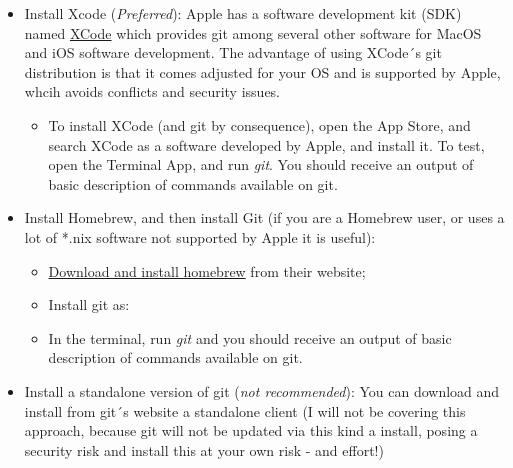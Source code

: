 \documentclass[
]{book}
\newenvironment{Shaded}{\begin{snugshade}}{\end{snugshade}}
\newcommand{\ExtensionTok}[1]{#1}
\newcommand{\NormalTok}[1]{#1}
\providecommand{\tightlist}{%
  \setlength{\itemsep}{0pt}\setlength{\parskip}{0pt}}
\begin{document}
\begin{itemize}
\tightlist
\item
  Install Xcode (\emph{Preferred}): Apple has a software development kit (SDK) named
  \href{https://developer.apple.com/xcode/}{XCode} which provides git among several other
  software for MacOS and iOS software development. The advantage of using XCode´s
  git distribution is that it comes adjusted for your OS and is supported by Apple,
  whcih avoids conflicts and security issues.

  \begin{itemize}
  \tightlist
  \item
    To install XCode (and git by consequence), open the App Store, and search
    XCode as a software developed by Apple, and install it. To test, open the
    Terminal App, and run \emph{git}. You should receive an output of basic
    description of commands available on git.
  \end{itemize}
\item
  Install Homebrew, and then install Git (if you are a Homebrew user, or uses a
  lot of *.nix software not supported by Apple it is useful):

  \begin{itemize}
  \tightlist
  \item
    \href{https://brew.sh/}{Download and install homebrew} from their website;
  \item
    Install git as:
  \end{itemize}

\begin{Shaded}
\end{Shaded}

  \begin{itemize}
  \tightlist
  \item
    In the terminal, run \emph{git} and you should receive an output of basic
    description of commands available on git.
  \end{itemize}
\item
  Install a standalone version of git (\emph{not recommended}): You can download and
  install from git´s website a standalone client (I will not be covering this
  approach, because git will not be updated via this kind a install, posing a
  security risk and install this at your own risk - and effort!)
\end{itemize}
\end{document}
